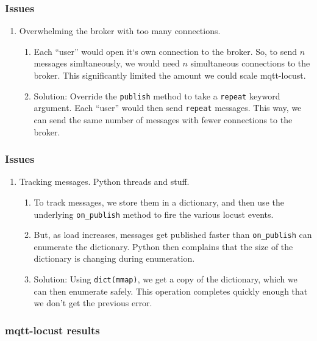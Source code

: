 \documentclass{beamer}
\begin{document}
\begin{frame}
    \frametitle{Issues}
    \begin{enumerate}
        \item
            Overwhelming the broker with too many connections.
            \begin{enumerate}
                \item Each ``user'' would open it`s own connection to the
                broker. So, to send $n$ messages simltaneously, we would need
                $n$ simultaneous connections to the broker. This significantly
                limited the amount we could scale mqtt-locust.
                \item Solution: Override the \texttt{publish} method to take a
                \texttt{repeat} keyword argument. Each ``user'' would then send
                \texttt{repeat} messages. This way, we can send the same number
                of messages with fewer connections to the broker.
            \end{enumerate}
    \end{enumerate}
\end{frame}

\begin{frame}
    \frametitle{Issues}
    \begin{enumerate}
        \item
            Tracking messages. Python threads and stuff.
            \begin{enumerate}
                \item To track messages, we store them in a dictionary, and
                then use the underlying \texttt{on\_publish} method to fire the
                various locust events.
                \item But, as load increases, messages get published faster
                than \texttt{on\_publish} can enumerate the dictionary. Python
                then complains that the size of the dictionary is changing
                during enumeration.
                \item Solution: Using \texttt{dict(mmap)}, we get a copy of the
                dictionary, which we can then enumerate safely. This operation
                completes quickly enough that we don't get the previous error.
            \end{enumerate}
    \end{enumerate}
\end{frame}

\begin{frame}
    \frametitle{mqtt-locust results}
\end{frame}
\end{document}
